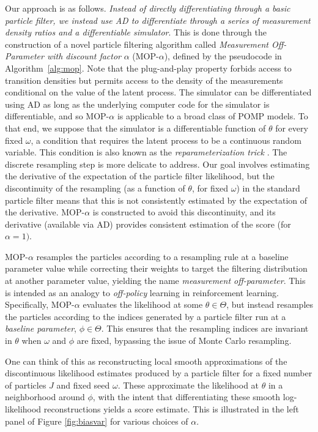 \documentclass[numsec,webpdf,modern,medium,namedate]{oup-authoring-template}
\theoremstyle{thmstyleone}%
\theoremstyle{thmstyletwo}%
\theoremstyle{thmstylethree}%
\begin{document}
Our approach is as follows. \textit{Instead of directly differentiating through a basic particle filter, we instead use AD to differentiate through a series of measurement density ratios and a differentiable simulator}. 
This is done through the construction of a novel particle filtering algorithm called {\it Measurement Off-Parameter with discount factor} $\alpha$ (MOP-$\alpha$), defined by the pseudocode in Algorithm~\ref{alg:mop}.
Note that the plug-and-play property forbids access to transition densities but permits access to the density of the measurements conditional on the value of the latent process.
The simulator can be differentiated using AD as long as the underlying computer code for the simulator is differentiable, and so MOP-$\alpha$ is applicable to a broad class of POMP models.
To that end, we suppose that the simulator is a differentiable function of $\theta$ for every fixed $\omega$, a condition that requires the latent process to be a continuous random variable. 
This condition is also known as the {\it reparameterization trick} \citep{corenflos21}.
The discrete resampling step is more delicate to address. 
Our goal involves estimating the derivative of the expectation of the particle filter likelihood, but the discontinuity of the resampling (as a function of $\theta$, for fixed $\omega$) in the standard particle filter means that this is not consistently estimated by the expectation of the derivative. 
MOP-$\alpha$ is constructed to avoid this discontinuity, and its derivative (available via AD) provides consistent estimation of the score (for $\alpha=1)$.

MOP-$\alpha$ resamples the particles according to a resampling rule at a baseline parameter value while correcting their weights to target the filtering distribution at another parameter value, yielding the name {\it measurement off-parameter}.
This is intended as an analogy to {\it off-policy} learning in reinforcement learning.
Specifically, MOP-$\alpha$ evaluates the likelihood at some $\theta \in \Theta$, but instead resamples the particles according to the indices generated by a particle filter run at a {\it baseline parameter}, $\phi \in \Theta$.
This ensures that the resampling indices are invariant in $\theta$ when $\omega$ and $\phi$ are fixed, bypassing the issue of Monte Carlo resampling.

One can think of this as reconstructing local smooth approximations of the discontinuous likelihood estimates produced by a particle filter for a fixed number of particles $J$ and fixed seed $\omega$. These approximate the likelihood at $\theta$ in a neighborhood around $\phi$, with the intent that differentiating these smooth log-likelihood reconstructions yields a score estimate. This is illustrated in the left panel of Figure \ref{fig:biasvar} for various choices of $\alpha$. 
\end{document}
